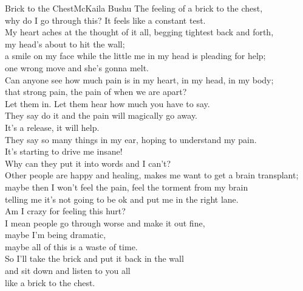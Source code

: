 \begin{poetry}{Brick to the Chest}{McKaila Bushu}
The feeling of a brick to the chest,\\
why do I go through this? It feels like a constant test.\\
My heart aches at the thought of it all, begging tightest back and forth,\\
my head's about to hit the wall;\\
a smile on my face while the little me in my head is pleading for help;\\
one wrong move and she's gonna melt.\\
Can anyone see how much pain is in my heart, in my head, in my body;\\
that strong pain, the pain of when we are apart?\\
Let them in. Let them hear how much you have to say.\\
They say do it and the pain will magically go away.\\
It's a release, it will help.\\
They say so many things in my ear, hoping to understand my pain.\\
It's starting to drive me insane!\\
Why can they put it into words and I can't?\\
Other people are happy and healing, makes me want to get a brain transplant;\\
maybe then I won't feel the pain, feel the torment from my brain\\
telling me it's not going to be ok and put me in the right lane.\\
Am I crazy for feeling this hurt?\\
I mean people go through worse and make it out fine,\\
maybe I'm being dramatic,\\
maybe all of this is a waste of time.\\
So I'll take the brick and put it back in the wall\\
and sit down and listen to you all\\
like a brick to the chest.
\end{poetry}

